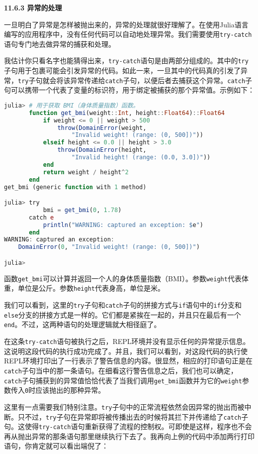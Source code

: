 \textbf{11.6.3 异常的处理}

一旦明白了异常是怎样被抛出来的，异常的处理就很好理解了。在使用Julia语言编写的应用程序中，没有任何代码可以自动地处理异常。我们需要使用\verb|try-catch|语句专门地去做异常的捕获和处理。

我估计你只看名字也能猜得出来，\verb|try-catch|语句是由两部分组成的。其中的\verb|try|子句用于包裹可能会引发异常的代码。如此一来，一旦其中的代码真的引发了异常，\verb|try|子句就会将该异常传递给\verb|catch|子句，以便后者去捕获这个异常。\verb|catch|子句可以携带一个代表了变量的标识符，用于绑定被捕获的那个异常值。示例如下：

\begin{lstlisting}[language=julia]
julia> # 用于获取 BMI（身体质量指数）函数。
       function get_bmi(weight::Int, height::Float64)::Float64
           if weight <= 0 || weight > 500
               throw(DomainError(weight, 
                   "Invalid weight! (range: (0, 500])"))
           elseif height <= 0.0 || height > 3.0
               throw(DomainError(height, 
                   "Invalid height! (range: (0.0, 3.0])"))
           end
           return weight / height^2
       end
get_bmi (generic function with 1 method)

julia> try 
           bmi = get_bmi(0, 1.78)
       catch e
           println("WARNING: captured an exception: $e")
       end
WARNING: captured an exception: 
    DomainError(0, "Invalid weight! (range: (0, 500])")

julia> 
\end{lstlisting}

函数\verb|get_bmi|可以计算并返回一个人的身体质量指数（BMI）。参数\verb|weight|代表体重，单位是公斤。参数\verb|height|代表身高，单位是米。

我们可以看到，这里的\verb|try|子句和\verb|catch|子句的拼接方式与\verb|if|语句中的\verb|if|分支和\verb|else|分支的拼接方式是一样的。它们都是紧挨在一起的，并且只在最后有一个\verb|end|。不过，这两种语句的处理逻辑就大相径庭了。

在这条\verb|try-catch|语句被执行之后，REPL环境并没有显示任何的异常提示信息。这说明这段代码的执行成功完成了。并且，我们可以看到，对这段代码的执行使REPL环境打印出了一行表示了警告信息的内容。很显然，相应的打印语句正是在\verb|catch|子句当中的那一条语句。在细看这行警告信息之后，我们也可以确定，\verb|catch|子句捕获到的异常值恰恰代表了当我们调用\verb|get_bmi|函数并为它的\verb|weight|参数传入\verb|0|时应该抛出的那种异常。

这里有一点需要我们特别注意。\verb|try|子句中的正常流程依然会因异常的抛出而被中断。只不过，\verb|try|子句在异常即将被传播出去的时候将其拦下并传递给了\verb|catch|子句。这使得\verb|try-catch|语句重新获得了流程的控制权。可即使是这样，程序也不会再从抛出异常的那条语句那里继续执行下去了。我再向上例的代码中添加两行打印语句，你肯定就可以看出端倪了：

